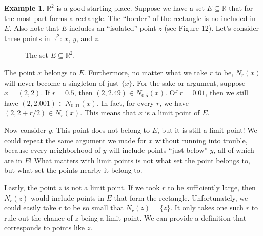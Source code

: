 \documentclass{article}
\newcommand{\R}{\mathbb{R}}
\theoremstyle{definition}
\newtheorem{example}{Example}[section]
\begin{document}
\begin{example}
$\R^2$ is a good starting place. Suppose we have a set $ E\subseteq \R $ that for the most part forms a rectangle. The ``border'' of the rectangle is no included in $ E $. Also note that $ E $ includes an ``isolated'' point $ z $ (see Figure 12). Let's consider three points in $ \R^2 $: $ x $, $ y $, and $ z $.  
		\begin{figure}[h]
	\centering
	\caption{The set $ E\subseteq \R^2 $.}
\end{figure}

The point $ x $ belongs to $ E $. Furthermore, no matter what we take $ r $ to be, $ N_r(x) $ will never become a singleton of just $ \{x\} $. For the sake or argument, suppose $ x=(2,2) $. If $ r=0.5 $, then $ (2,2.49)\in N_{0.5}(x) $. Of $ r=0.01 $, then we still have $ (2,2.001)\in N_{0.01}(x) $. In fact, for every $ r $, we have $ (2,2+r/2)\in N_r(x) $. This means that $ x $ is a limit point of $ E $. 

Now consider $ y $. This point does not belong to $ E $, but it is still a limit point! We could repeat the same argument we made for $ x $ without running into trouble, because every neighborhood of $ y $ will include points ``just below'' $ y $, all of which are in $ E $! What matters with limit points is not what set the point belongs to, but what set the points nearby it belong to. 

Lastly, the point $ z $ is not a limit point. If we took $ r $ to be sufficiently large, then $ N_r(z) $ would include points in $ E $ that form the rectangle. Unfortunately, we could easily take $ r$ to be so small that $ N_r(z)=\{z\} $. It only takes one such $ r $ to rule out the chance of $ z $ being a limit point. We can provide a definition that corresponds to points like $ z $.     
\end{example}
\end{document}
